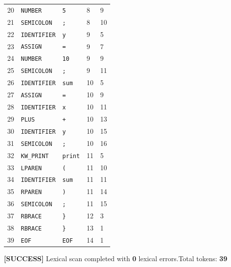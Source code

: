 \documentclass[11pt,a4paper]{article}
\begin{document}
\begin{center}
\begin{tabular}{|C{0.5cm}|L{4.2cm}|L{3.8cm}|C{1.4cm}|C{1.5cm}|}
20 & \texttt{NUMBER}       & \texttt{5}          & 8  & 9  \\
21 & \texttt{SEMICOLON}    & \texttt{;}          & 8  & 10 \\
22 & \texttt{IDENTIFIER}   & \texttt{y}          & 9  & 5  \\
23 & \texttt{ASSIGN}       & \texttt{=}          & 9  & 7  \\
24 & \texttt{NUMBER}       & \texttt{10}         & 9  & 9  \\
25 & \texttt{SEMICOLON}    & \texttt{;}          & 9  & 11 \\
26 & \texttt{IDENTIFIER}   & \texttt{sum}        & 10 & 5  \\
27 & \texttt{ASSIGN}       & \texttt{=}          & 10 & 9  \\
28 & \texttt{IDENTIFIER}   & \texttt{x}          & 10 & 11 \\
29 & \texttt{PLUS}         & \texttt{+}          & 10 & 13 \\
30 & \texttt{IDENTIFIER}   & \texttt{y}          & 10 & 15 \\
31 & \texttt{SEMICOLON}    & \texttt{;}          & 10 & 16 \\
32 & \texttt{KW\_PRINT}    & \texttt{print}      & 11 & 5  \\
33 & \texttt{LPAREN}       & \texttt{(}          & 11 & 10 \\
34 & \texttt{IDENTIFIER}   & \texttt{sum}        & 11 & 11 \\
35 & \texttt{RPAREN}       & \texttt{)}          & 11 & 14 \\
36 & \texttt{SEMICOLON}    & \texttt{;}          & 11 & 15 \\
37 & \texttt{RBRACE}       & \texttt{\}}         & 12 & 3  \\
38 & \texttt{RBRACE}       & \texttt{\}}         & 13 & 1  \\
39 & \texttt{EOF}          & \texttt{EOF}        & 14 & 1  \\
\hline
\end{tabular}
\end{center}

\begin{tcolorbox}[successbox]
\textbf{\color{SuccessGreen}[SUCCESS]} Lexical scan completed with \textbf{0} lexical errors.\quad Total tokens: \textbf{39}
\end{tcolorbox}

\end{document}

